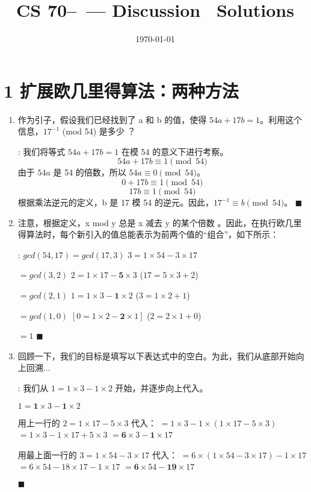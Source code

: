 \documentclass[11pt]{article}
\title{CS 70--\Session\ --- Discussion \Homework \ Solutions}
\author{\Name}
\date{\today}
\newenvironment{qparts}{\begin{enumerate}[{(}a{)}]}{\end{enumerate}}
\def\endproofmark{$\blacksquare$}
\newenvironment{proof}{\par\noindent{\bf 解答}:}{\endproofmark\smallskip}
\begin{document}
\maketitle

\section*{1 扩展欧几里得算法：两种方法}

\begin{qparts}
\item 作为引子，假设我们已经找到了 a 和 b 的值，使得 $54a+17b=1$。利用这个信息，$17^{-1}$ (mod 54) 是多少 ？
\begin{proof}
我们将等式 $54a+17b=1$ 在模 54 的意义下进行考察。
\[ 54a+17b \equiv 1 \pmod{54} \]
由于 $54a$ 是 54 的倍数，所以 $54a \equiv 0 \pmod{54}$。
\[ 0 + 17b \equiv 1 \pmod{54} \]
\[ 17b \equiv 1 \pmod{54} \]
根据乘法逆元的定义，b 是 17 模 54 的逆元。因此，$17^{-1} \equiv b \pmod{54}$。
\end{proof}

\item 注意，根据定义，x mod y 总是 x 减去 y 的某个倍数 。因此，在执行欧几里得算法时，每个新引入的值总能表示为前两个值的“组合”，如下所示： 
\begin{proof}
$gcd(54,17)=gcd(17,3)$
\quad $3=1\times54-3\times17$

$=gcd(3,2)$
\quad $2=1\times17- \textbf{5} \times3$ \quad ($17 = 5 \times 3 + 2$)

$=gcd(2,1)$
\quad $1=1\times3- \textbf{1} \times2$ \quad ($3 = 1 \times 2 + 1$)

$=gcd(1,0)$
\quad $[0=1\times2- \textbf{2} \times1]$ \quad ($2 = 2 \times 1 + 0$)

$=1$
\end{proof}

\item 回顾一下，我们的目标是填写以下表达式中的空白。为此，我们从底部开始向上回溯...
\begin{proof}
我们从 $1 = 1 \times 3 - 1 \times 2$ 开始，并逐步向上代入。

$1 = \textbf{1} \times 3 - \textbf{1} \times 2$

用上一行的 $2 = 1 \times 17 - 5 \times 3$ 代入：
$= 1 \times 3 - 1 \times (1 \times 17 - 5 \times 3)$
$= 1 \times 3 - 1 \times 17 + 5 \times 3$
$= \textbf{6} \times 3 - \textbf{1} \times 17$

用最上面一行的 $3 = 1 \times 54 - 3 \times 17$ 代入：
$= 6 \times (1 \times 54 - 3 \times 17) - 1 \times 17$
$= 6 \times 54 - 18 \times 17 - 1 \times 17$
$= \textbf{6} \times 54 - \textbf{19} \times 17$


\end{proof}
\end{qparts}
\end{document}
